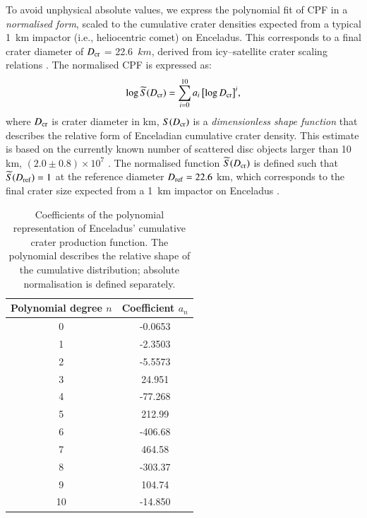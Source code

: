 \documentclass[preprint,11pt,3p,times,authoryear]{elsarticle}
\begin{document}
{To avoid unphysical absolute values, we express the polynomial fit of CPF in a \emph{normalised form}, scaled to the cumulative crater densities expected from a typical 1~km impactor (i.e., heliocentric comet) on Enceladus. This corresponds to a final crater diameter of $D_{\rm cr}$ = 22.6~$km$, derived from icy–satellite crater scaling relations \citep[e.g.,][]{Zahnle2003}. The normalised CPF is expressed as:
\begin{equation}
    \log \widetilde{S}(D_{\rm cr}) = \sum_{i=0}^{10} a_i \, \bigl[\log D_{\rm cr}\bigr]^i,
    \label{equ:cpf_scale}
\end{equation}
where $D_{\rm cr}$ is crater diameter in km, $S(D_{\rm cr})$ is a \emph{dimensionless shape function} that describes the relative form of Enceladian cumulative crater density.
This estimate is based on the currently known number of scattered disc objects larger than 10 km, $(2.0 \pm 0.8) \times 10^{7}$ \citep{Nesvorny2019}. The normalised function $\widetilde{S}(D_{\rm cr})$ is defined such that $\widetilde{S}(D_{\rm ref}) = 1$ at the reference diameter $D_{\rm ref} = 22.6$ km, which corresponds to the final crater size expected from a 1~km impactor on Enceladus \citep{Zahnle2003,Wong2023}. \\

\begin{table}[t]%
\centering
\begin{tabular}{cc}
\hline
\textbf{Polynomial degree $n$} & \textbf{Coefficient $a_n$} \\
\hline
0 & -0.0653  \\
1 & -2.3503 \\
2 & -5.5573 \\
3 & 24.951  \\
4 & -77.268 \\
5 & 212.99  \\
6 & -406.68 \\
7 & 464.58  \\
8 & -303.37 \\
9 & 104.74  \\
10 & -14.850 \\
\hline
\end{tabular}
\caption{Coefficients of the polynomial representation of Enceladus’ cumulative crater production function. The polynomial describes the relative shape of the cumulative distribution; absolute normalisation is defined separately.}
\label{tab:cpf}
\end{table}

}
\end{document}
